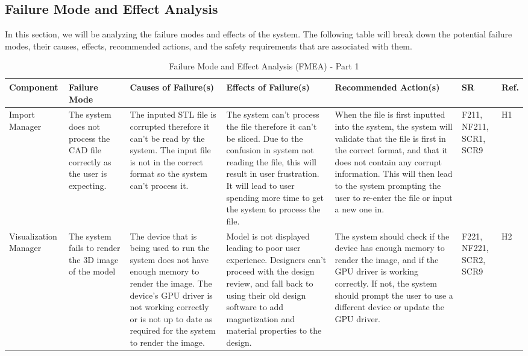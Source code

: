\documentclass{article}
\begin{document}
\begin{landscape}
\section{Failure Mode and Effect Analysis}
In this section, we will be analyzing the failure modes and effects of the system. The following table will break down the potential failure modes, their causes, effects, recommended actions, and the safety requirements that are associated with them.
\begin{table}[H]
\centering
\caption{Failure Mode and Effect Analysis (FMEA) - Part 1}
\renewcommand{\arraystretch}{1.1} 
\footnotesize 
\begin{tabular}{|p{3cm}|p{3cm}|p{3.8cm}|p{3.8cm}|p{5.5cm}|p{2cm}|p{1cm}|}
\hline
\textbf{Component} & \textbf{Failure Mode} & \textbf{Causes of Failure(s)} & \textbf{Effects of Failure(s)} & \textbf{Recommended Action(s)} & \textbf{SR} & \textbf{Ref.} \\
\hline
Import Manager & The system does not process the CAD file correctly as the user is expecting. & \textbullet{} The inputed STL file is corrupted therefore it can't be read by the system.\newline \textbullet{} The input file is not in the correct format so the system can't process it.& \textbullet{} The system can't process the file therefore it can't be sliced. \newline \textbullet{} Due to the confusion in system not reading the file, this will result in user frustration. \newline \textbullet{} It will lead to user spending more time to get the system to process the file. & When the file is first inputted into the system, the system will validate that the file is first in the correct format, and that it does not contain any corrupt information. This will then lead to the system prompting the user to re-enter the file or input a new one in. & F211, NF211, SCR1, SCR9 & H1 \\
\hline
Visualization Manager & The system fails to render the 3D image of the model & \textbullet{} The device that is being used to run the system does not have enough memory to render the image. \newline \textbullet{} The device's GPU driver is not working correctly or is not up to date as required for the system to render the image. & \textbullet{} Model is not displayed leading to poor user experience. \newline \textbullet{} Designers can't proceed with the design review, and fall back to using their old design software to add magnetization and material properties to the design. & The system should check if the device has enough memory to render the image, and if the GPU driver is working correctly. If not, the system should prompt the user to use a different device or update the GPU driver. & F221, NF221, SCR2, SCR9 & H2 \\

\end{tabular}
\end{table}
\end{landscape}
\end{document}
